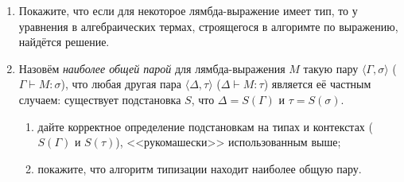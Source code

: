 \documentclass[10pt,a4paper,oneside]{article}
\begin{document}
\begin{enumerate}
\item Покажите, что если для некоторое лямбда-выражение имеет тип, то у уравнения в алгебраических
термах, строящегося в алгоримте по выражению, найдётся решение.

\item Назовём \emph{наиболее общей парой} для лямбда-выражения $M$ такую пару $\langle \Gamma, \sigma \rangle$ ($\Gamma\vdash M:\sigma$), 
что любая другая пара $\langle\Delta,\tau\rangle$ ($\Delta\vdash M:\tau$) является её частным случаем:
существует подстановка $S$, что $\Delta = S(\Gamma)$ и $\tau = S(\sigma)$. 
\begin{enumerate}
\item дайте корректное определение подстановкам на типах и контекстах ($S(\Gamma)$ и $S(\tau)$), 
<<рукомашески>> использованным выше;
\item покажите, что алгоритм типизации находит наиболее общую пару.
\end{enumerate}

\end{enumerate}
\end{document}
